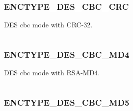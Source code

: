 \documentclass[letterpaper,10pt,english]{sphinxmanual}
\begin{document}
\subsubsection{ENCTYPE\_DES\_CBC\_CRC}
\label{appdev/refs/macros/ENCTYPE_DES_CBC_CRC:enctype-des-cbc-crc-data}\label{appdev/refs/macros/ENCTYPE_DES_CBC_CRC:enctype-des-cbc-crc}\label{appdev/refs/macros/ENCTYPE_DES_CBC_CRC::doc}

\begin{fulllineitems}
\label{appdev/refs/macros/ENCTYPE_DES_CBC_CRC:ENCTYPE_DES_CBC_CRC}
\end{fulllineitems}


DES cbc mode with CRC-32.

\begin{tabulary}{\linewidth}{|L|L|}
\hline

 & 
\\\hline
\end{tabulary}



\subsubsection{ENCTYPE\_DES\_CBC\_MD4}
\label{appdev/refs/macros/ENCTYPE_DES_CBC_MD4:enctype-des-cbc-md4-data}\label{appdev/refs/macros/ENCTYPE_DES_CBC_MD4::doc}\label{appdev/refs/macros/ENCTYPE_DES_CBC_MD4:enctype-des-cbc-md4}

\begin{fulllineitems}
\label{appdev/refs/macros/ENCTYPE_DES_CBC_MD4:ENCTYPE_DES_CBC_MD4}
\end{fulllineitems}


DES cbc mode with RSA-MD4.

\begin{tabulary}{\linewidth}{|L|L|}
\hline

 & 
\\\hline
\end{tabulary}



\subsubsection{ENCTYPE\_DES\_CBC\_MD5}
\label{appdev/refs/macros/ENCTYPE_DES_CBC_MD5:enctype-des-cbc-md5-data}\label{appdev/refs/macros/ENCTYPE_DES_CBC_MD5::doc}\label{appdev/refs/macros/ENCTYPE_DES_CBC_MD5:enctype-des-cbc-md5}
\end{document}
